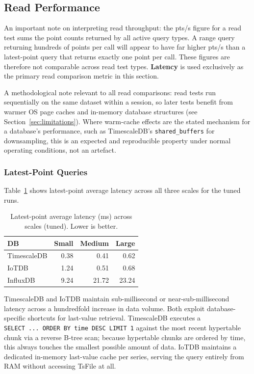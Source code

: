 \subsection{Read Performance}
\label{sec:read-results}

An important note on interpreting read throughput: the pts/s figure for a read test sums
the point counts returned by all active query types. A range query returning hundreds of
points per call will appear to have far higher pts/s than a latest-point query that returns
exactly one point per call. These figures are therefore not comparable across read test types.
\textbf{Latency} is used exclusively as the primary read comparison metric in this section.

A methodological note relevant to all read comparisons: read tests run sequentially on the
same dataset within a session, so later tests benefit from warmer OS page caches and
in-memory database structures (see Section~\ref{sec:limitations}). Where warm-cache effects
are the stated mechanism for a database's performance, such as TimescaleDB's
\texttt{shared\_buffers} for downsampling, this is an expected and reproducible property
under normal operating conditions, not an artefact.

\subsubsection{Latest-Point Queries}

Table~\ref{tab:latest} shows latest-point average latency across all three scales for the
tuned runs.

\begin{table}[ht]
  \centering
  \caption{Latest-point average latency (ms) across scales (tuned). Lower is better.}
  \label{tab:latest}
  \begin{tabular}{lrrr}
    \hline
    \textbf{DB} & \textbf{Small} & \textbf{Medium} & \textbf{Large} \\
    \hline
    TimescaleDB &  0.38 &  0.41 &  0.62 \\
    IoTDB       &  1.24 &  0.51 &  0.68 \\
    InfluxDB    &  9.24 & 21.72 & 23.24 \\
    \hline
  \end{tabular}
\end{table}

TimescaleDB and IoTDB maintain sub-millisecond or near-sub-millisecond latency across
a hundredfold increase in data volume. Both exploit database-specific shortcuts for last-value retrieval.
TimescaleDB executes a \texttt{SELECT~...~ORDER~BY~time~DESC~LIMIT~1} against the most
recent hypertable chunk via a reverse B-tree scan; because hypertable chunks are ordered
by time, this always touches the smallest possible amount of data. IoTDB maintains a
dedicated in-memory last-value cache per series, serving the query entirely from RAM
without accessing TsFile at all.

